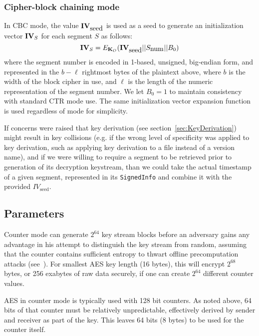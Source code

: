 \subsubsection{Cipher-block chaining mode}

In CBC mode, the value ${\textbf{IV}}_{\mbox{seed}}$ is used as a seed to
generate an initialization vector ${\textbf{IV}}_S$ for each segment $S$ as
follows:
$${\textbf{IV}}_S = E_{{\textbf{K}_O}}({\textbf{IV}}_{\mbox{seed}} || S_{\mbox{num}} || B_0)$$
where the segment number is encoded in 1-based, unsigned, big-endian
form, and represented in the $b-\ell$ rightmost bytes of the plaintext
above, where $b$ is the width of the block cipher in use, and $\ell$
is the length of the numeric representation of the segment number. We
let $B_0=1$ to maintain consistency with standard CTR mode use. The
same initialization vector expansion function is used regardless of
mode for simplicity.

If concerns were raised that key derivation (see
section~\ref{sec:KeyDerivation}) might result in key collisions
(e.g. if the wrong level of specificity was applied to key derivation,
such as applying key derivation to a file instead of a version name),
and if we were willing to require a segment to be retrieved prior to
generation of its decryption keystream, than we could take the actual
timestamp of a given segment, represented in its {\tt SignedInfo} and
combine it with the provided $IV_{\mbox{seed}}$.


\subsection{Parameters}

Counter mode can generate $2^{64}$ key stream blocks before an
adversary gains any advantage in his attempt to distinguish the key
stream from random, assuming that the counter contains sufficient
entropy to thwart offline precomputation attacks
(see~\cite{McG2002}). For smallest AES key length (16 bytes), this
will encrypt $2^{68}$ bytes, or 256 exabytes of raw data securely, if
one can create $2^{64}$ different counter values.

AES in counter mode is typically used with 128 bit counters. As noted
above, 64 bits of that counter must be relatively unpredictable,
effectively derived by sender and receiver as part of the key. This
leaves 64 bits (8 bytes) to be used for the counter itself.

